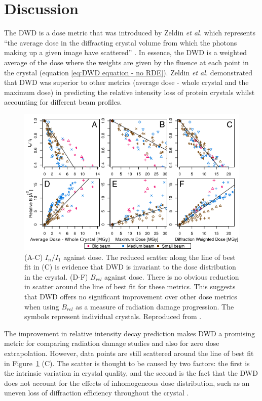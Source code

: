 \section{Discussion}
\label{sec:Discussion - Dose Decay Modelling}
The DWD is a dose metric that was introduced by Zeldin \textit{et al.} which represents ``the average dose in the diffracting crystal volume from which the photons making up a given image have scattered'' \cite{zeldin2013dwd}.
In essence, the DWD is a weighted average of the dose where the weights are given by the fluence at each point in the crystal (equation \ref{eq:DWD equation - no RDE}).
Zeldin \textit{et al.} demonstrated that DWD was superior to other metrics (average dose - whole crystal and the maximum dose) in predicting the relative intensity loss of protein crystals whilst accounting for different beam profiles.
\begin{figure}
  \centering
    \includegraphics[width=1\textwidth]{figures/dwd/zeldin_metric_comparisons.png}
    \caption[Dose metric comparison: DWD, Average dose (whole crystal) and Maximum dose]{(A-C) $I_n/I_1$ against dose.
    The reduced scatter along the line of best fit in (C) is evidence that DWD is invariant to the dose distribution in the crystal.
    (D-F) $B_{rel}$ against dose.
    There is no obvious reduction in scatter around the line of best fit for these metrics.
    This suggests that DWD offers no significant improvement over other dose metrics when using $B_{rel}$ as a measure of radiation damage progression.
    The symbols represent individual crystals.
    Reproduced from \cite{zeldin2013dwd}.}
    \label{fig:Dose metric comparisons - zeldin et al}
\end{figure}
The improvement in relative intensity decay prediction makes DWD a promising metric for comparing radiation damage studies and also for zero dose extrapolation.
However, data points are still scattered around the line of best fit in Figure~\ref{fig:Dose metric comparisons - zeldin et al} (C).
The scatter is thought to be caused by two factors:
the first is the intrinsic variation in crystal quality, and the second is the fact that the DWD does not account for the effects of inhomogeneous dose distribution, such as an uneven loss of diffraction efficiency throughout the crystal \cite{zeldin2013dwd}.

